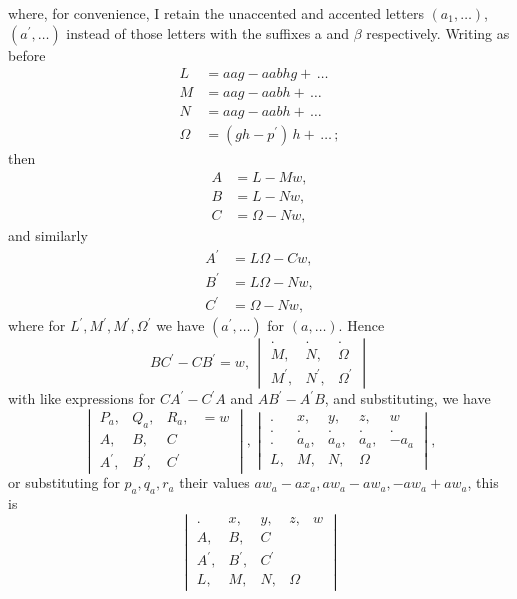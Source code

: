\documentclass[11pt,a4paper]{book}
\begin{document}
\noindent
where, for convenience, I retain the unaccented and accented letters $(a_1, \ldots)$, $(a^{\prime}, \ldots)$
instead of those letters with the suffixes a and $\beta$ respectively. Writing as before
\begin{align*}
L &= \mathit{aag - aabhg + \,\ldots}\\
M &= \mathit{aag - aabh + \,\ldots}\\
N &= \mathit{aag - aabh + \,\ldots}\\
\Omega &= \mathit{(gh - p^{\prime})\,h + \,\ldots\,;}
\end{align*}
then
\begin{align*}
A &= L - Mw,\\
B &= L - Nw,\\
C &= \Omega - Nw,
\end{align*}
and similarly
\begin{align*}
A^{\prime} &= L\Omega - Cw,\\
B^{\prime} &= L\Omega - Nw,\\
C^{\prime} &= \Omega - Nw,
\end{align*}
where for $L^{\prime}, M^{\prime}, M^{\prime}, \Omega^{\prime}$ we have $(a^{\prime}, \ldots)$ for $(a, \ldots)$. Hence
\[
BC^{\prime} - CB^{\prime} = w,\,
\begin{vmatrix}
. & . & . \\
M, & N, & \Omega \\
M^{\prime}, & N^{\prime}, & \Omega^{\prime}
\end{vmatrix}
\]
with like expressions for $CA^{\prime} - C^{\prime}A$ and $AB^{\prime} - A^{\prime}B$, and substituting, we have
\[
\begin{vmatrix}
P_a, & Q_a, & R_a, & = w \\
A, & B, & C \\
A^{\prime}, & B^{\prime}, & C^{\prime}
\end{vmatrix},
\begin{vmatrix}
. & x, & y, & z, & w \\
. & . & . & . & .\\
. & a_a, & a_a, & a_a, & -a_a \\
L, & M, & N, & \Omega
\end{vmatrix},
\]
or substituting for $p_a, q_a, r_a$ their values $aw_a - a x_a, aw_a - a w_a, -aw_a + a w_a$, this is
\[
\begin{vmatrix}
. & x, & y, & z, & w \\
A, & B, & C\\
A^{\prime}, & B^{\prime}, & C^{\prime}\\
L, & M, & N, & \Omega
\end{vmatrix}
\]
\end{document}
